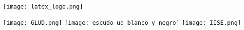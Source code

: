 

\begin{frame}
   
    \begin{center}
    
        \texttt{[image: latex\_logo.png]}
        
       \vspace{0.3cm}
        
        \texttt{[image: GLUD.png]}
        \texttt{[image: escudo\_ud\_blanco\_y\_negro]}
        \texttt{[image: IISE.png]}
    
    \end{center}

\end{frame}
